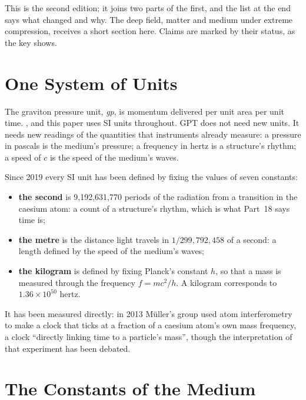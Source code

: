 \documentclass[11pt,a4paper]{article}
\begin{document}
This is the second edition; it joins two parts of the first, and the list at the end says what changed and why. The deep field, matter and medium under extreme compression, receives a short section here. Claims are marked by their status, as the key shows.

\statuskey

\section{One System of Units}
\label{sec:units}

The graviton pressure unit, \emph{gp}, is momentum delivered per unit area per unit time. , and this paper uses SI units throughout. GPT does not need new units. It needs new readings of the quantities that instruments already measure: a pressure in pascals is the medium's pressure; a frequency in hertz is a structure's rhythm; a speed of $c$ is the speed of the medium's waves.

 Since 2019 every SI unit has been defined by fixing the values of seven constants:
\begin{itemize}
\item \textbf{the second} is 9,192,631,770 periods of the radiation from a transition in the caesium atom: a count of a structure's rhythm, which is what Part~18 says time is;
\item \textbf{the metre} is the distance light travels in $1/299{,}792{,}458$ of a second: a length defined by the speed of the medium's waves;
\item \textbf{the kilogram} is defined by fixing Planck's constant $h$, so that a mass is measured through the frequency $f = mc^2/h$. A kilogram corresponds to $1.36\times10^{50}$ hertz.
\end{itemize}
 It has been measured directly: in 2013 Müller's group used atom interferometry to make a clock that ticks at a fraction of a caesium atom's own mass frequency, a clock ``directly linking time to a particle's mass'', though the interpretation of that experiment has been debated.

\section{The Constants of the Medium}
\label{sec:constants}
\end{document}
